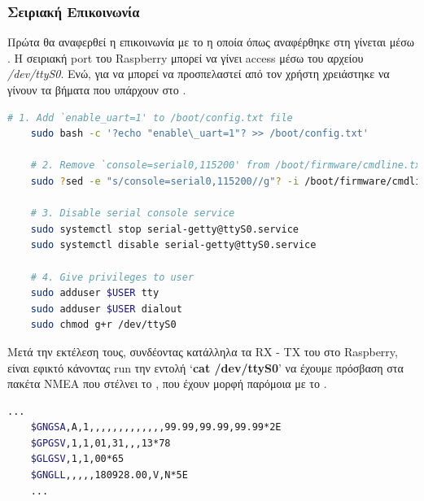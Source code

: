 \subsubsection{Σειριακή Επικοινωνία}
Πρώτα θα αναφερθεί η επικοινωνία με το  η οποία όπως αναφέρθηκε στη  γίνεται μέσω . Η σειριακή port του Raspberry μπορεί να γίνει access μέσω του αρχείου \textit{/dev/ttyS0}. Ενώ, για να μπορεί να προσπελαστεί από τον χρήστη χρειάστηκε να γίνουν τα βήματα \cite{serial-fix} που υπάρχουν στο .
\newpage

\begin{lstlisting}[language=bash, escapechar=?, caption={Fix serial communication},label=list:fix-serial-communication]
    # 1. Add `enable_uart=1' to /boot/config.txt file
    sudo bash -c '?echo "enable\_uart=1"? >> /boot/config.txt'

    # 2. Remove `console=serial0,115200' from /boot/firmware/cmdline.txt
    sudo ?sed -e "s/console=serial0,115200//g"? -i /boot/firmware/cmdline.txt

    # 3. Disable serial console service
    sudo systemctl stop serial-getty@ttyS0.service
    sudo systemctl disable serial-getty@ttyS0.service

    # 4. Give privileges to user
    sudo adduser $USER tty
    sudo adduser $USER dialout
    sudo chmod g+r /dev/ttyS0
\end{lstlisting}

Μετά την εκτέλεση τους, συνδέοντας κατάλληλα τα RX - TX του  στο Ra\-spbe\-rry, είναι εφικτό κάνοντας run την εντολή `\textbf{cat /dev/ttyS0}' να έχουμε πρόσβαση στα πακέτα NMEA που στέλνει το , που έχουν μορφή παρόμοια με το .

\begin{lstlisting}[language=bash, escapechar=@, caption={Serial Output, NMEA packets example},label=list:serial-output]
    ...
    $GNGSA,A,1,,,,,,,,,,,,,99.99,99.99,99.99*2E
    $GPGSV,1,1,01,31,,,13*78
    $GLGSV,1,1,00*65
    $GNGLL,,,,,180928.00,V,N*5E
    ...
\end{lstlisting}

